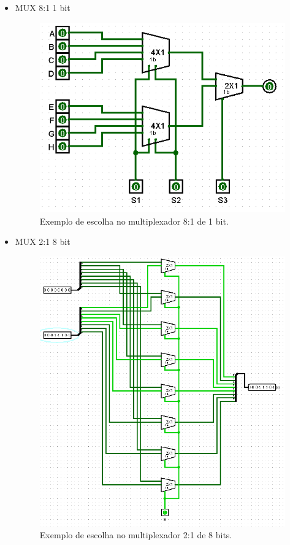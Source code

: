 \documentclass[
	12pt,				%
	openright,			%
	twoside,			%
	a4paper,			%
	english,			%
	french,				%
	spanish,			%
	brazil,				%
	]{abntex2}
\begin{document}
\begin{apendicesenv}
\begin{itemize}
\newpage
\item {MUX 8:1 1 bit}
\begin{figure}[H]
	\begin{center}
	    \includegraphics[scale=0.4]{mux811teste.png}
	\end{center}
\caption{\label{mux811teste}Exemplo de escolha no multiplexador 8:1 de 1 bit.}
\end{figure}

\item {MUX 2:1 8 bit}
\begin{figure}[H]
	\begin{center}
	    \includegraphics[scale=0.45]{mux218teste.png}
	\end{center}
\caption{\label{mux218teste}Exemplo de escolha no multiplexador 2:1 de 8 bits.}
\end{figure}


\end{itemize}
\end{apendicesenv}
\end{document}
